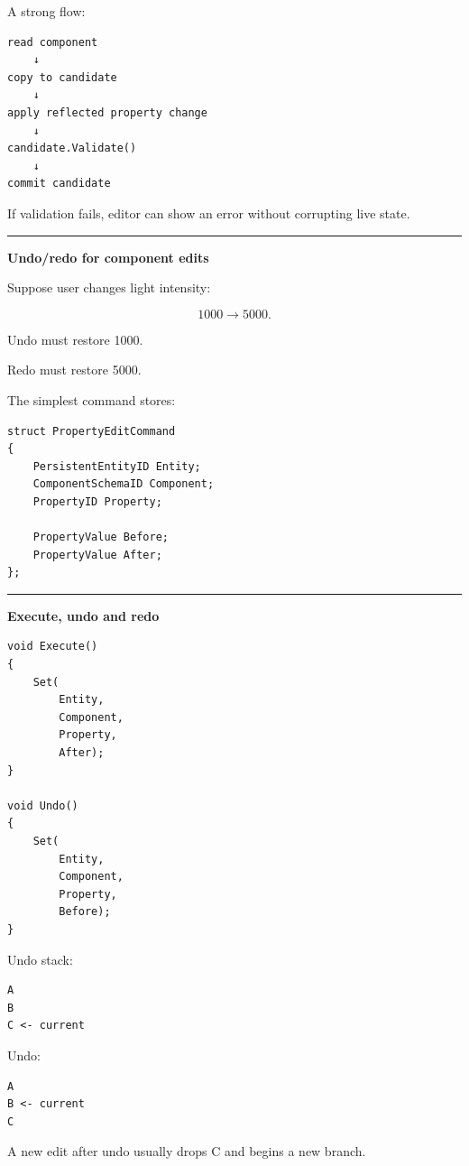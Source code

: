 A strong flow:

\begin{verbatim}
read component
    ↓
copy to candidate
    ↓
apply reflected property change
    ↓
candidate.Validate()
    ↓
commit candidate
\end{verbatim}

If validation fails, editor can show an error without corrupting live state.

\begin{center}\rule{0.5\linewidth}{0.5pt}\end{center}

\textbf{Undo/redo for component edits}

Suppose user changes light intensity:

\[
1000\rightarrow5000.
\]

Undo must restore 1000.

Redo must restore 5000.

The simplest command stores:

\begin{verbatim}
struct PropertyEditCommand
{
    PersistentEntityID Entity;
    ComponentSchemaID Component;
    PropertyID Property;

    PropertyValue Before;
    PropertyValue After;
};
\end{verbatim}

\begin{center}\rule{0.5\linewidth}{0.5pt}\end{center}

\textbf{Execute, undo and redo}

\begin{verbatim}
void Execute()
{
    Set(
        Entity,
        Component,
        Property,
        After);
}

void Undo()
{
    Set(
        Entity,
        Component,
        Property,
        Before);
}
\end{verbatim}

Undo stack:

\begin{verbatim}
A
B
C <- current
\end{verbatim}

Undo:

\begin{verbatim}
A
B <- current
C
\end{verbatim}

A new edit after undo usually drops C and begins a new branch.

